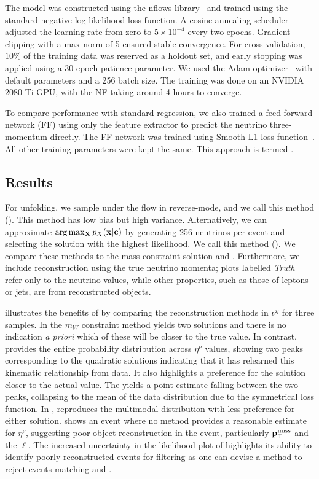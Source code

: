 The model was constructed using the nflows library~\cite{nflows} and trained using the standard negative log-likelihood loss function.
A cosine annealing scheduler adjusted the learning rate from zero to $5\times 10^{-4}$ every two epochs.
Gradient clipping with a max-norm of 5 ensured stable convergence.
For cross-validation, $10\%$ of the training data was reserved as a holdout set, and early stopping was applied using a 30-epoch patience parameter.
We used the Adam optimizer~\cite{Adam} with default parameters and a 256 batch size.
The training was done on an NVIDIA 2080-Ti GPU, with the NF taking around 4 hours to converge.

To compare performance with standard regression, we also trained a feed-forward network (FF) using only the feature extractor to predict the neutrino three-momentum directly.
The FF network was trained using Smooth-L1 loss function~\cite{SmoothL1}.
All other training parameters were kept the same.
This approach is termed \nuff{}\@.

\subsection{Results}
\newcommand{\nusample}{\nuflow(\text{sample})}
\newcommand{\numode}{\nuflow(\text{mode})}

For unfolding, we sample under the flow in reverse-mode, and we call this method \nusample.
This method has low bias but high variance.
Alternatively, we can approximate $\arg\max_{\mathbf{X}}{p_X(\mathbf{x}|\mathbf{c})}$ by generating 256 neutrinos per event and selecting the solution with the highest likelihood.
We call this method \numode.
We compare these methods to the mass constraint solution and \nuff.
Furthermore, we include reconstruction using the true neutrino momenta; plots labelled \emph{Truth} refer only to the neutrino values, while other properties, such as those of leptons or jets, are from reconstructed objects.

 illustrates the benefits of \nuflow{} by comparing the reconstruction methods in $\nu^\eta$ for three samples.
In  the $m_W$ constraint method yields two solutions and there is no indication \textit{a priori} which of these will be closer to the true value.
In contrast, \nuflow{} provides the entire probability distribution across $\eta^\nu$ values, showing two peaks corresponding to the quadratic solutions indicating that it has relearned this kinematic relationship from data.
It also highlights a preference for the solution closer to the actual value.
The \nuff{} yields a point estimate falling between the two peaks, collapsing to the mean of the data distribution due to the symmetrical loss function.
In , \nuflow{} reproduces the multimodal distribution with less preference for either solution.
 shows an event where no method provides a reasonable estimate for $\eta^\nu$, suggesting poor object reconstruction in the event, particularly $\mathbf{p}_{\text{T}}^{\text{miss}}$ and the $\ell$.
The increased uncertainty in the likelihood plot of \nuflow{} highlights its ability to identify poorly reconstructed events for filtering as one can devise a method to reject events matching  and .

